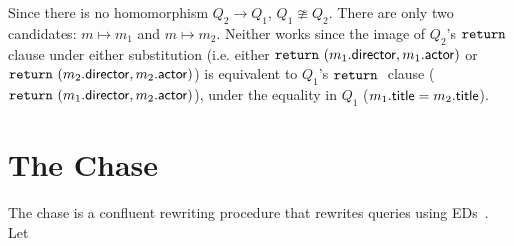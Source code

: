 \documentclass[preprint]{sigplanconf}
\newcommand{\RETURN}{{\tt return} \ }
\begin{document}
Since there is no homomorphism $Q_2 \to Q_1$, $Q_1 \ncong Q_2$.  
There are only two candidates: $m \mapsto m_1$ and $m \mapsto m_2$.  
Neither works since the image of $Q_2$'s $\RETURN$ clause under either substitution (i.e. either $\RETURN (m_1.{\sf director}, m_1.{\sf actor})$ or $\RETURN (m_2.{\sf director}, m_2.{\sf actor})$) is equivalent to $Q_1$'s $\RETURN$ clause ($\RETURN (m_1.{\sf director}, m_2.{\sf actor})$), under the equality in $Q_1$ ($m_1.{\sf title} = m_2.{\sf title}$).

%
%


\section{The Chase}
\label{sec:chase}

The chase is a confluent rewriting procedure that rewrites queries using EDs~\cite{foundations}.   Let
\end{document}
